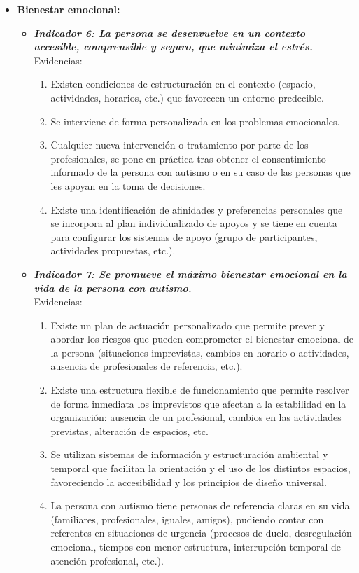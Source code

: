 \begin{itemize}
\begin{itemize}
\begin{itemize}
\begin{itemize}
\begin{enumerate}
				\end{enumerate}
			\end{itemize}
			\item \textbf{Bienestar emocional:}
			\begin{itemize}
				\item \textbf{\textit{Indicador 6: La persona se desenvuelve en un contexto accesible, comprensible y seguro, que minimiza el estrés.}}\\Evidencias:
				\begin{enumerate}
					\item Existen condiciones de estructuración en el contexto (espacio, actividades, horarios, etc.) que favorecen un entorno predecible.  
					\item Se interviene de forma personalizada en los problemas emocionales. 
					\item Cualquier nueva intervención o tratamiento por parte de los profesionales, se pone en práctica tras obtener el consentimiento informado de la persona con autismo o en su caso de las personas que les apoyan en la toma de decisiones. 
					\item Existe una identificación de afinidades y preferencias personales que se incorpora al plan individualizado de apoyos y se tiene en cuenta para configurar los sistemas de apoyo (grupo de participantes, actividades propuestas, etc.).  
					 
				\end{enumerate}
				\item \textbf{\textit{Indicador 7: Se promueve el máximo bienestar emocional en la vida de la persona con autismo.}}\\Evidencias:
				\begin{enumerate}
					\item Existe un plan de actuación personalizado que permite prever y abordar los riesgos que pueden comprometer el bienestar emocional de la persona (situaciones imprevistas, cambios en horario o actividades, ausencia de profesionales de referencia, etc.).  
					\item Existe una estructura flexible de funcionamiento que permite resolver de forma inmediata los imprevistos que afectan a la estabilidad en la organización: ausencia de un profesional, cambios en las actividades previstas, alteración de espacios, etc. 
					\item Se utilizan sistemas de información y estructuración ambiental y temporal que facilitan la orientación y el uso de los distintos espacios, favoreciendo la accesibilidad y los principios de diseño universal.  
					\item La persona con autismo tiene personas de referencia claras en su vida (familiares, profesionales, iguales, amigos), pudiendo contar con referentes en situaciones de urgencia (procesos de duelo, desregulación emocional, tiempos con menor estructura, interrupción temporal de atención profesional, etc.). 
					 

\end{enumerate}
\end{itemize}
\end{itemize}
\end{itemize}
\end{itemize}
